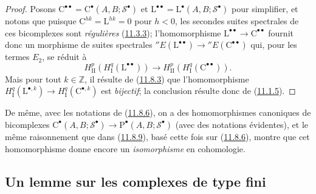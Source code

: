 \begin{proof}
Posons $\mathrm C^{\bullet\bullet}=
\mathrm C^\bullet(A,B;\mathscr S^\bullet)$ et
$\mathrm L^{\bullet\bullet}=
\mathrm L^\bullet(A,B;\mathscr S^\bullet)$ pour simplifier, et notons que
puisque $\mathrm C^{hk}=\mathrm L^{hk}=0$ pour $h<0$, les secondes suites
spectrales de ces bicomplexes sont \emph{régulières}
(\hyperref[0.11.3.3-fr]{11.3.3}); l'homomorphisme
$\mathrm L^{\bullet\bullet}\to\mathrm C^{\bullet\bullet}$ fournit donc un
morphisme de suites spectrales
${}''E(\mathrm L^{\bullet\bullet})\to
{}''E(\mathrm C^{\bullet\bullet})$
qui, pour les termes $E_2$, se réduit à
\[
\label{0.11.8.9.1-fr}
\tag{11.8.9.1}
H^p_{\mathrm{II}}(H^q_{\mathrm I}(\mathrm L^{\bullet\bullet}))
\longrightarrow
H^p_{\mathrm{II}}(H^q_{\mathrm I}(\mathrm C^{\bullet\bullet})).
\]
Mais pour tout $k\in\mathbb Z$, il résulte de
(\hyperref[0.11.8.3-fr]{11.8.3}) que l'homomorphisme
$H^q_{\mathrm I}(\mathrm L^{\bullet,k})\to
H^q_{\mathrm I}(\mathrm C^{\bullet,k})$ est \emph{bijectif}; la conclusion résulte
donc de (\hyperref[0.11.1.5-fr]{11.1.5}).
\end{proof}

\begin{env}[11.8.10]
\label{0.11.8.10-fr}
De même, avec les notations de (\hyperref[0.11.8.6-fr]{11.8.6}), on a des
homomorphismes canoniques de bicomplexes
$\mathrm C^\bullet(A,B;\mathscr S^\bullet)\to
\mathrm P^\bullet(A,B;\mathscr S^\bullet)$
(avec des notations évidentes), et le même raisonnement que dans
(\hyperref[0.11.8.9-fr]{11.8.9}), basé cette fois sur
(\hyperref[0.11.8.6-fr]{11.8.6}), montre que cet homomorphisme donne encore
un \emph{isomorphisme} en cohomologie.
\end{env}

\subsection{Un lemme sur les complexes de type fini}
\label{subsection:0.11.9-fr}


